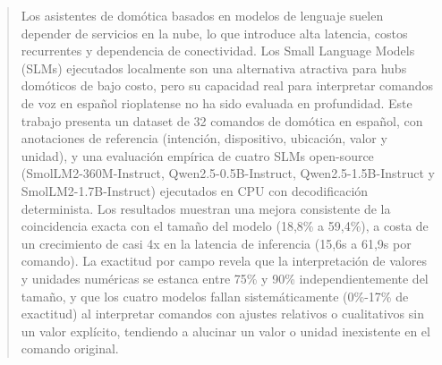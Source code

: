 \begin{abstract}
Los asistentes de domótica basados en modelos de lenguaje suelen depender de
servicios en la nube, lo que introduce alta latencia, costos recurrentes y
dependencia de conectividad. Los Small Language Models (SLMs) ejecutados
localmente son una alternativa atractiva para hubs domóticos de bajo costo,
pero su capacidad real para interpretar comandos de voz en español
rioplatense no ha sido evaluada en profundidad. Este trabajo presenta un
dataset de 32 comandos de domótica en español, con anotaciones de referencia
(intención, dispositivo, ubicación, valor y unidad), y una evaluación
empírica de cuatro SLMs open-source (SmolLM2-360M-Instruct,
Qwen2.5-0.5B-Instruct, Qwen2.5-1.5B-Instruct y SmolLM2-1.7B-Instruct)
ejecutados en CPU con decodificación determinista. Los resultados muestran
una mejora consistente de la coincidencia exacta con el tamaño del modelo
(18,8\% a 59,4\%), a costa de un crecimiento de casi 4x en la latencia de
inferencia (15,6s a 61,9s por comando). La exactitud por campo revela que la
interpretación de valores y unidades numéricas se estanca entre 75\% y 90\%
independientemente del tamaño, y que los cuatro modelos fallan
sistemáticamente (0\%-17\% de exactitud) al interpretar comandos con ajustes
relativos o cualitativos sin un valor explícito, tendiendo a alucinar un
valor o unidad inexistente en el comando original.

\end{abstract}

